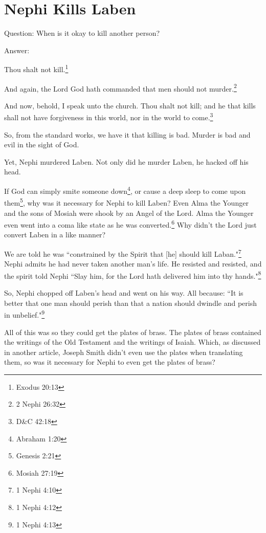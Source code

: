 \chapter{Nephi Kills Laben}

Question: When is it okay to kill another person?

Answer:

\begin{displayquote}
Thou shalt not kill.\footnote{Exodus 20:13}
\end{displayquote}

\begin{displayquote}
And again, the Lord God hath commanded that men should not 
murder.\footnote{2 Nephi 26:32}
\end{displayquote}

\begin{displayquote}
And now, behold, I speak unto the church. Thou shalt not kill; 
and he that kills shall not have forgiveness in this world, nor in the 
world to come.\footnote{D\&C 42:18}
\end{displayquote}

So, from the standard works, we have it that killing is bad. Murder is bad and evil
in the sight of God.

Yet, Nephi murdered Laben. Not only did he murder Laben, he hacked off his head.

If God can simply smite someone down\footnote{Abraham 1:20}, or cause a deep sleep 
to come upon them\footnote{Genesis 2:21}, why was it necessary for Nephi to kill 
Laben? Even Alma the Younger and the sons of Mosiah were shook by an Angel of the 
Lord. Alma the Younger even went into a coma like state as he was 
converted.\footnote{Mosiah 27:19} Why didn't the Lord just convert Laben in a like 
manner?

We are told he was ``constrained by the Spirit that [he] should kill 
Laban."\footnote{1 Nephi 4:10} Nephi admits he had never taken
another man's life. He resisted and resisted, and the spirit told Nephi ``Slay him,
for the Lord hath delivered him into thy hands."\footnote{1 Nephi 4:12}

So, Nephi chopped off Laben's head and went on his way. All because: ``It is better
that one man should perish than that a nation should dwindle and perish in
unbelief."\footnote{1 Nephi 4:13}

All of this was so they could get the plates of brass. The plates of brass contained
the writings of the Old Testament and the writings of Isaiah. Which, as discussed in
another article, Joseph Smith didn't even use the plates when translating them, so
was it necessary for Nephi to even get the plates of brass?